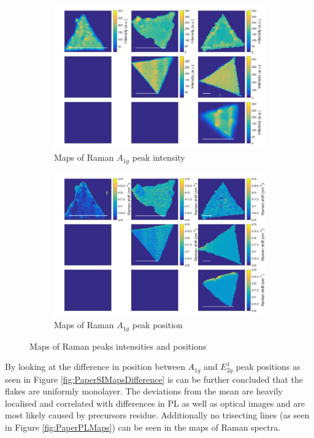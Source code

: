 \begin{figure}[h]
\begin{center}
\begin{subfigure}[b]{0.4\textwidth}
			\includegraphics[width=\textwidth]{PaperSIMapsIntensityA.png}
			\caption{Maps of Raman $A_{1g}$ peak intensity}
			\label{fig:PaperSIMapsIntensityA}
		\end{subfigure}
		\quad
		\begin{subfigure}[b]{0.4\textwidth}
			\includegraphics[width=\textwidth]{PaperSIMapsPositionA.png}
			\caption{Maps of Raman $A_{1g}$ peak position}
			\label{fig:PaperSIMapsPositionA}
		\end{subfigure}
		\caption{Maps of Raman peaks intensities and positions}
		\label{fig:PaperSIMapsRaman}
	\end{center}
\end{figure}

By looking at the difference in position between $A_{1g}$ and $E^1_{2g}$ peak positions as seen in Figure \ref{fig:PaperSIMapsDifference} is can be further concluded that the flakes are uniformly monolayer. The deviations from the mean are heavily localised and correlated with differences in PL as well as optical images and are most likely caused by precursors residue. Additionally no trisecting lines (as seen in Figure \ref{fig:PaperPLMaps}) can be seen in the maps of Raman spectra.

